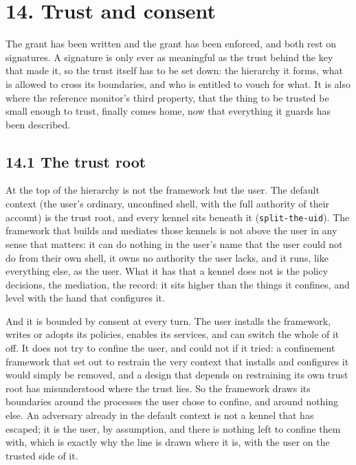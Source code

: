 \hypertarget{trust-and-consent}{%
\chapter{14. Trust and consent}\label{trust-and-consent}}

The grant has been written and the grant has been enforced, and both
rest on signatures. A signature is only ever as meaningful as the trust
behind the key that made it, so the trust itself has to be set down: the
hierarchy it forms, what is allowed to cross its boundaries, and who is
entitled to vouch for what. It is also where the reference monitor's
third property, that the thing to be trusted be small enough to trust,
finally comes home, now that everything it guards has been described.

\hypertarget{the-trust-root}{%
\section{14.1 The trust root}\label{the-trust-root}}

At the top of the hierarchy is not the framework but the user. The
default context (the user's ordinary, unconfined shell, with the full
authority of their account) is the trust root, and every kennel sits
beneath it (\texttt{split-the-uid}). The framework that builds and
mediates those kennels is not above the user in any sense that matters:
it can do nothing in the user's name that the user could not do from
their own shell, it owns no authority the user lacks, and it runs, like
everything else, as the user. What it has that a kennel does not is the
policy decisions, the mediation, the record: it sits higher than the
things it confines, and level with the hand that configures it.

And it is bounded by consent at every turn. The user installs the
framework, writes or adopts its policies, enables its services, and can
switch the whole of it off. It does not try to confine the user, and
could not if it tried: a confinement framework that set out to restrain
the very context that installs and configures it would simply be
removed, and a design that depends on restraining its own trust root has
misunderstood where the trust lies. So the framework draws its
boundaries around the processes the user chose to confine, and around
nothing else. An adversary already in the default context is not a
kennel that has escaped; it is the user, by assumption, and there is
nothing left to confine them with, which is exactly why the line is
drawn where it is, with the user on the trusted side of it.

